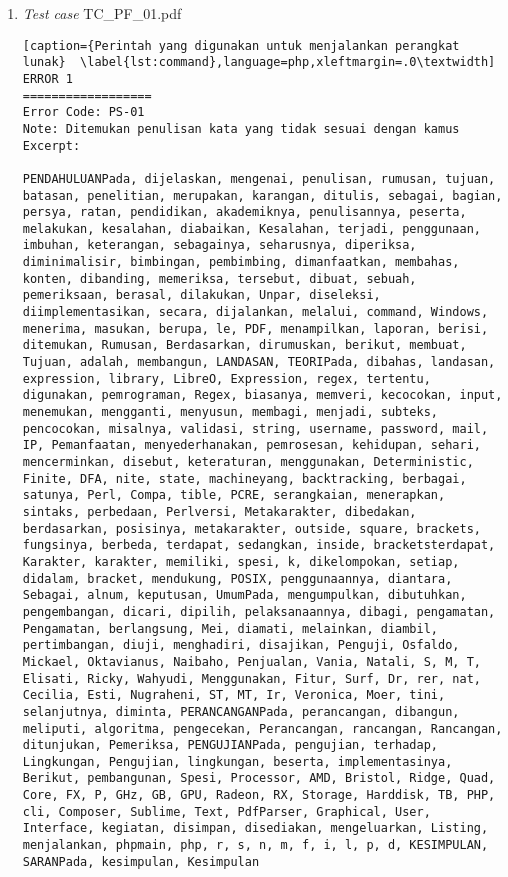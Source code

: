 \begin{enumerate}

	\item \textit{Test case} TC\_PF\_01.pdf
	
\begin{lstlisting}[caption={Perintah yang digunakan untuk menjalankan perangkat lunak}	\label{lst:command},language=php,xleftmargin=.0\textwidth]
ERROR 1
==================
Error Code: PS-01
Note: Ditemukan penulisan kata yang tidak sesuai dengan kamus
Excerpt: 

PENDAHULUANPada, dijelaskan, mengenai, penulisan, rumusan, tujuan, batasan, penelitian, merupakan, karangan, ditulis, sebagai, bagian, persya, ratan, pendidikan, akademiknya, penulisannya, peserta, melakukan, kesalahan, diabaikan, Kesalahan, terjadi, penggunaan, imbuhan, keterangan, sebagainya, seharusnya, diperiksa, diminimalisir, bimbingan, pembimbing, dimanfaatkan, membahas, konten, dibanding, memeriksa, tersebut, dibuat, sebuah, pemeriksaan, berasal, dilakukan, Unpar, diseleksi, diimplementasikan, secara, dijalankan, melalui, command, Windows, menerima, masukan, berupa, le, PDF, menampilkan, laporan, berisi, ditemukan, Rumusan, Berdasarkan, dirumuskan, berikut, membuat, Tujuan, adalah, membangun, LANDASAN, TEORIPada, dibahas, landasan, expression, library, LibreO, Expression, regex, tertentu, digunakan, pemrograman, Regex, biasanya, memveri, kecocokan, input, menemukan, mengganti, menyusun, membagi, menjadi, subteks, pencocokan, misalnya, validasi, string, username, password, mail, IP, Pemanfaatan, menyederhanakan, pemrosesan, kehidupan, sehari, mencerminkan, disebut, keteraturan, menggunakan, Deterministic, Finite, DFA, nite, state, machineyang, backtracking, berbagai, satunya, Perl, Compa, tible, PCRE, serangkaian, menerapkan, sintaks, perbedaan, Perlversi, Metakarakter, dibedakan, berdasarkan, posisinya, metakarakter, outside, square, brackets, fungsinya, berbeda, terdapat, sedangkan, inside, bracketsterdapat, Karakter, karakter, memiliki, spesi, k, dikelompokan, setiap, didalam, bracket, mendukung, POSIX, penggunaannya, diantara, Sebagai, alnum, keputusan, UmumPada, mengumpulkan, dibutuhkan, pengembangan, dicari, dipilih, pelaksanaannya, dibagi, pengamatan, Pengamatan, berlangsung, Mei, diamati, melainkan, diambil, pertimbangan, diuji, menghadiri, disajikan, Penguji, Osfaldo, Mickael, Oktavianus, Naibaho, Penjualan, Vania, Natali, S, M, T, Elisati, Ricky, Wahyudi, Menggunakan, Fitur, Surf, Dr, rer, nat, Cecilia, Esti, Nugraheni, ST, MT, Ir, Veronica, Moer, tini, selanjutnya, diminta, PERANCANGANPada, perancangan, dibangun, meliputi, algoritma, pengecekan, Perancangan, rancangan, Rancangan, ditunjukan, Pemeriksa, PENGUJIANPada, pengujian, terhadap, Lingkungan, Pengujian, lingkungan, beserta, implementasinya, Berikut, pembangunan, Spesi, Processor, AMD, Bristol, Ridge, Quad, Core, FX, P, GHz, GB, GPU, Radeon, RX, Storage, Harddisk, TB, PHP, cli, Composer, Sublime, Text, PdfParser, Graphical, User, Interface, kegiatan, disimpan, disediakan, mengeluarkan, Listing, menjalankan, phpmain, php, r, s, n, m, f, i, l, p, d, KESIMPULAN, SARANPada, kesimpulan, Kesimpulan
\end{lstlisting}
	

\end{enumerate}
